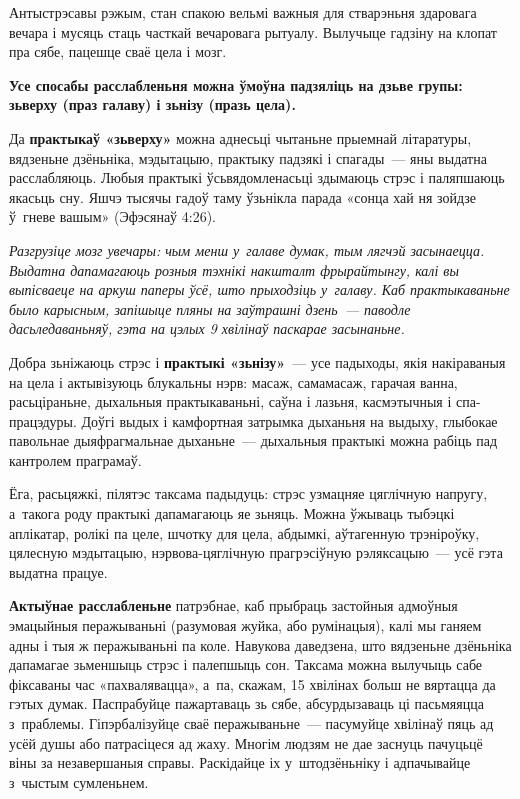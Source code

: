 Антыстрэсавы рэжым, стан спакою вельмі важныя для стварэньня здаровага вечара і мусяць стаць часткай вечаровага рытуалу. Вылучыце гадзіну на клопат пра сябе, пацешце сваё цела і мозг.

\textbf{Усе спосабы расслабленьня можна ўмоўна падзяліць на дзьве групы: зьверху (праз галаву) і зьнізу (празь цела).}

Да \textbf{практыкаў «зьверху»} можна аднесьці чытаньне прыемнай літаратуры, вядзеньне дзёньніка, мэдытацыю, практыку падзякі і спагады~--- яны выдатна расслабляюць. Любыя практыкі ўсьвядомленасьці здымаюць стрэс і паляпшаюць якасьць сну. Яшчэ тысячы гадоў таму ўзьнікла парада «сонца хай ня зойдзе ў~гневе вашым» (Эфэсянаў 4:26).

\emph{Разгрузіце мозг увечары: чым менш у~галаве думак, тым лягчэй засынаецца. Выдатна дапамагаюць розныя тэхнікі накшталт фрырайтынгу, калі вы выпісваеце на аркуш паперы ўсё, што прыходзіць у~галаву. Каб практыкаваньне было карысным, запішыце пляны на заўтрашні дзень~--- паводле дасьледаваньняў, гэта на цэлых 9 хвілінаў паскарае засынаньне.}

Добра зьніжаюць стрэс і \textbf{практыкі «зьнізу»}~--- усе падыходы, якія накіраваныя на цела і актывізуюць блукальны нэрв: масаж, самамасаж, гарачая ванна, расьціраньне, дыхальныя практыкаваньні, саўна і лазьня, касмэтычныя і спа-працэдуры. Доўгі выдых і камфортная затрымка дыханьня на выдыху, глыбокае павольнае дыяфрагмальнае дыханьне~--- дыхальныя практыкі можна рабіць пад кантролем праграмаў.

Ёга, расьцяжкі, пілятэс таксама падыдуць: стрэс узмацняе цяглічную напругу, а~такога роду практыкі дапамагаюць яе зьняць. Можна ўжываць тыбэцкі аплікатар, ролікі па целе, шчотку для цела, абдымкі, аўтагенную трэніроўку, цялесную мэдытацыю, нэрвова-цяглічную прагрэсіўную рэляксацыю~--- усё гэта выдатна працуе.


\textbf{Актыўнае расслабленьне} патрэбнае, каб прыбраць застойныя адмоўныя эмацыйныя перажываньні (разумовая жуйка, або румінацыя), калі мы ганяем адны і тыя ж перажываньні па коле. Навукова даведзена, што вядзеньне дзёньніка дапамагае зьменшыць стрэс і палепшыць сон. Таксама можна вылучыць сабе фіксаваны час «пахвалявацца», а~па, скажам, 15 хвілінах больш не вяртацца да гэтых думак. Паспрабуйце пажартаваць зь сябе, абсурдызаваць ці пасьмяяцца з~праблемы. Гіпэрбалізуйце сваё перажываньне~--- пасумуйце хвілінаў пяць ад усёй душы або патрасіцеся ад жаху. Многім людзям не дае заснуць пачуцьцё віны за незавершаныя справы. Раскідайце іх у~штодзёньніку і адпачывайце з~чыстым сумленьнем.

